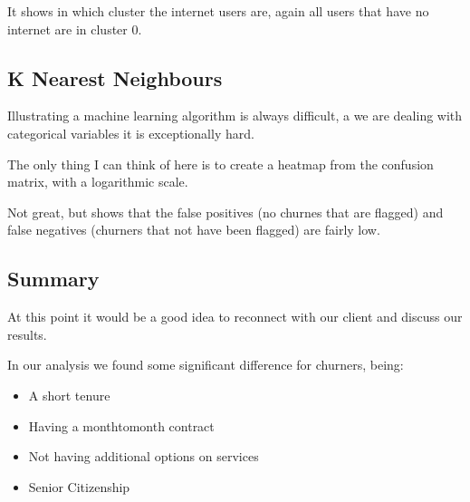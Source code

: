 \documentclass[letterpaper,10pt,english]{jupyterBook}
\begin{document}
\noindent{}

\sphinxAtStartPar
It shows in which cluster the internet users are, again all users that have no internet are in cluster 0.


\subsection{K Nearest Neighbours}
\label{\detokenize{c7_case_studies/Churn:k-nearest-neighbours}}
\sphinxAtStartPar
Illustrating a machine learning algorithm is always difficult, a we are dealing with categorical variables it is exceptionally hard.

\sphinxAtStartPar
The only thing I can think of here is to create a heatmap from the confusion matrix, with a logarithmic scale.

\begin{sphinxVerbatim}[commandchars=\\\{\}]
   
     
\end{sphinxVerbatim}

\noindent{}

\sphinxAtStartPar
Not great, but shows that the false positives (no churnes that are flagged) and false negatives (churners that not have been flagged) are fairly low.


\subsection{Summary}
\label{\detokenize{c7_case_studies/Churn:summary}}
\sphinxAtStartPar
At this point it would be a good idea to reconnect with our client and discuss our results.

\sphinxAtStartPar
In our analysis we found some significant difference for churners, being:
\begin{itemize}
\item {} 
\sphinxAtStartPar
A short tenure

\item {} 
\sphinxAtStartPar
Having a month\sphinxhyphen{}to\sphinxhyphen{}month contract

\item {} 
\sphinxAtStartPar
Not having additional options on services

\item {} 
\sphinxAtStartPar
Senior Citizenship

\end{itemize}
\end{document}

